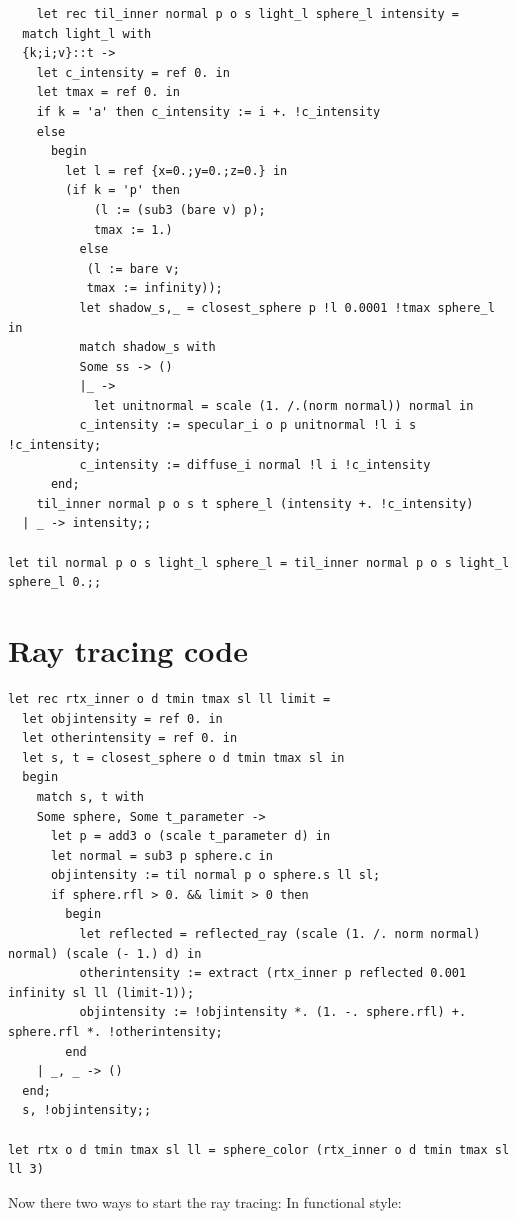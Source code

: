 \documentclass[conference]{IEEEtran}
\begin{document}
\begin{lstlisting}
    let rec til_inner normal p o s light_l sphere_l intensity = 
  match light_l with 
  {k;i;v}::t -> 
    let c_intensity = ref 0. in
    let tmax = ref 0. in 
    if k = 'a' then c_intensity := i +. !c_intensity 
    else 
      begin
        let l = ref {x=0.;y=0.;z=0.} in
        (if k = 'p' then
            (l := (sub3 (bare v) p); 
            tmax := 1.)
          else  
           (l := bare v;
           tmax := infinity));
          let shadow_s,_ = closest_sphere p !l 0.0001 !tmax sphere_l in 
          match shadow_s with 
          Some ss -> ()
          |_ -> 
            let unitnormal = scale (1. /.(norm normal)) normal in 
          c_intensity := specular_i o p unitnormal !l i s !c_intensity;
          c_intensity := diffuse_i normal !l i !c_intensity
      end;
    til_inner normal p o s t sphere_l (intensity +. !c_intensity)
  | _ -> intensity;;

let til normal p o s light_l sphere_l = til_inner normal p o s light_l sphere_l 0.;;
\end{lstlisting} 

\section{Ray tracing code}

\begin{lstlisting}
let rec rtx_inner o d tmin tmax sl ll limit =
  let objintensity = ref 0. in 
  let otherintensity = ref 0. in  
  let s, t = closest_sphere o d tmin tmax sl in 
  begin
    match s, t with 
    Some sphere, Some t_parameter ->
      let p = add3 o (scale t_parameter d) in 
      let normal = sub3 p sphere.c in
      objintensity := til normal p o sphere.s ll sl;
      if sphere.rfl > 0. && limit > 0 then
        begin
          let reflected = reflected_ray (scale (1. /. norm normal) normal) (scale (- 1.) d) in 
          otherintensity := extract (rtx_inner p reflected 0.001 infinity sl ll (limit-1));
          objintensity := !objintensity *. (1. -. sphere.rfl) +. sphere.rfl *. !otherintensity;
        end
    | _, _ -> ()
  end; 
  s, !objintensity;;

let rtx o d tmin tmax sl ll = sphere_color (rtx_inner o d tmin tmax sl ll 3)
\end{lstlisting}

Now there two ways to start the ray tracing: 
In functional style:
\end{document}

